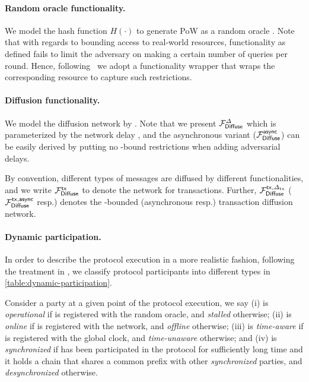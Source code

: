 

\paragraph{Random oracle functionality.}
%
We model the hash function $H(\cdot)$ to generate PoW as a random oracle \funcRO.
%
Note that with regards to bounding access to real-world resources, functionality \funcRO as defined fails to limit the adversary on making a certain number of queries per round.
%
Hence, following~\cite{C:BMTZ17,EC:GKOPZ20} we adopt a functionality wrapper \wrapper{\funcRO} that wraps the corresponding resource to capture such restrictions.



\paragraph{Diffusion functionality.}
%
We model the diffusion network by \funcDiffuse \cite{C:BMTZ17}.
%
Note that we present $\mathcal{F}_{\textsf{Diffuse}}^\varDelta$ which is parameterized by the network delay \delay, and the asynchronous variant ($\mathcal{F}_{\textsf{Diffuse}}^{\mathsf{async}}$) can be easily derived by putting no \delay-bound restrictions when adding adversarial delays.

By convention, different types of messages are diffused by different functionalities, and we write $\mathcal{F}_{\textsf{Diffuse}}^{\mathsf{tx}}$ to denote the network for transactions.
%
Further, $\mathcal{F}_{\textsf{Diffuse}}^{\mathsf{tx}, \varDelta_{\mathrm{tx}}}$ ($\mathcal{F}_{\textsf{Diffuse}}^{\mathsf{tx}, \mathsf{async}}$ resp.) denotes the \txDelay-bounded (asynchronous resp.) transaction diffusion network.



\paragraph{Dynamic participation.}
%
In order to describe the protocol execution in a more realistic fashion, following the treatment in \cite{CCS:BGKRZ18}, we classify protocol participants into different types in \cref{table:dynamic-participation}.



Consider a party \party at a given point of the protocol execution, we say
%
(i) \party is \emph{operational} if \party is registered with the random oracle, and \emph{stalled} otherwise;
%
(ii) \party is \emph{online} if \party is registered with the network, and \emph{offline} otherwise;
%
(iii) \party is \emph{time-aware} if \party is registered with the global clock, and \emph{time-unaware} otherwise;
%
and (iv) \party is \emph{synchronized} if \party has been participated in the protocol for sufficiently long time and it holds a chain that shares a common prefix with other \emph{synchronized} parties, and \emph{desynchronized} otherwise.

